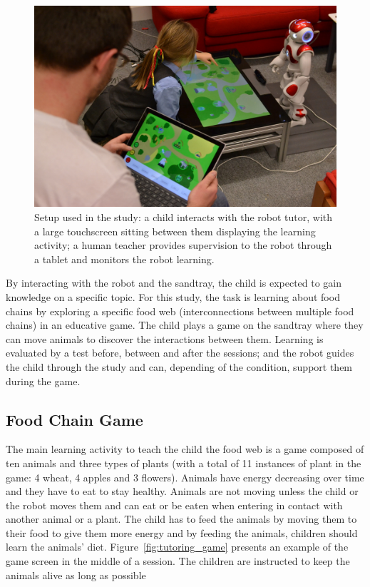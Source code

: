 \begin{figure}[ht]
	\centering
	\includegraphics[width=1\textwidth]{setup.jpg}
	\caption{Setup used in the study: a child interacts with the robot tutor, with a large touchscreen sitting between them displaying the learning activity; a human teacher provides supervision to the robot through a tablet and monitors the robot learning.}
	\label{fig:tutoring_setup}
\end{figure}

By interacting with the robot and the sandtray, the child is expected to gain knowledge on a specific topic. For this study, the task is learning about food chains by exploring a specific food web (interconnections between multiple food chains) in an educative game. The child plays a game on the sandtray where they can move animals to discover the interactions between them. Learning is evaluated by a test before, between and after the sessions; and the robot guides the child through the study and can, depending of the condition, support them during the game.

\subsection{Food Chain Game}

The main learning activity to teach the child the food web is a game composed of ten animals and three types of plants (with a total of 11 instances of plant in the game: 4 wheat, 4 apples and 3 flowers). Animals have energy decreasing over time and they have to eat to stay healthy. Animals are not moving unless the child or the robot moves them and can eat or be eaten when entering in contact with another animal or a plant. The child has to feed the animals by moving them to their food to give them more energy and by feeding the animals, children should learn the animals' diet. Figure~\ref{fig:tutoring_game} presents an example of the game screen in the middle of a session. The children are instructed to keep the animals alive as long as possible

